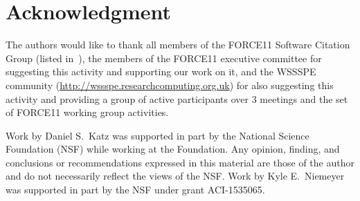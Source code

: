 \documentclass[conference]{IEEEtran}
\begin{document}




%





\section*{Acknowledgment}


The authors would like to thank all members of the FORCE11 Software Citation Group (listed in~\cite{bib3}), the members of the FORCE11 executive committee for suggesting this activity and supporting our work on it, and the WSSSPE community (\url{http://wssspe.researchcomputing.org.uk}) for also suggesting this activity and providing a group of active participants over 3 meetings and the set of FORCE11 working group activities.

Work by Daniel S.~Katz was supported in part by the National Science Foundation (NSF) while working at the Foundation.
Any opinion, finding, and conclusions or recommendations expressed in this material are those of the author and do not necessarily reflect the views of the NSF.
Work by Kyle E.~Niemeyer was supported in part by the NSF under grant ACI-1535065.






\end{document}
